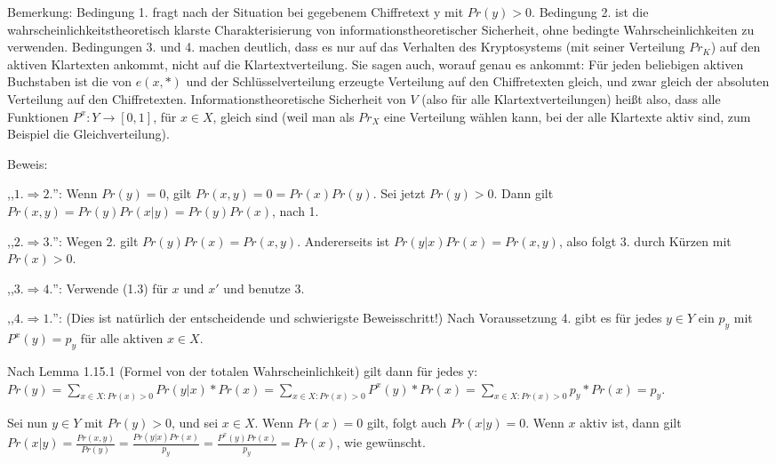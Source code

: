 \documentclass[a4paper]{article}
\begin{document}
\begin{multicols}{3}
    Bemerkung: Bedingung 1. fragt nach der Situation bei gegebenem Chiffretext y mit $Pr(y)>0$. Bedingung 2. ist die wahrscheinlichkeitstheoretisch klarste Charakterisierung von informationstheoretischer Sicherheit, ohne bedingte Wahrscheinlichkeiten zu verwenden. Bedingungen 3. und 4. machen deutlich, dass es nur auf das Verhalten des Kryptosystems (mit seiner Verteilung $Pr_K$) auf den aktiven Klartexten ankommt, nicht auf die Klartextverteilung. Sie sagen auch, worauf genau es ankommt: Für jeden beliebigen aktiven Buchstaben ist die von $e(x,*)$ und der Schlüsselverteilung erzeugte Verteilung auf den Chiffretexten gleich, und zwar gleich der absoluten Verteilung auf den Chiffretexten. Informationstheoretische Sicherheit von $V$ (also für alle Klartextverteilungen) heißt also, dass alle Funktionen $P^x:Y\rightarrow [0,1]$, für $x\in X$, gleich sind (weil man als $Pr_X$ eine Verteilung wählen kann, bei der alle Klartexte aktiv sind, zum Beispiel die Gleichverteilung).

    Beweis:
    \begin{itemize*}
        \item ,,$1.\Rightarrow 2.$'': Wenn $Pr(y)=0$, gilt $Pr(x,y)=0=Pr(x)Pr(y)$. Sei jetzt $Pr(y)>0$. Dann gilt $Pr(x,y)=Pr(y)Pr(x|y) = Pr(y)Pr(x)$, nach 1.
        \item ,,$2.\Rightarrow 3.$'': Wegen 2. gilt $Pr(y)Pr(x)=Pr(x,y)$. Andererseits ist $Pr(y|x)Pr(x)=Pr(x,y)$, also folgt 3. durch Kürzen mit $Pr(x)>0$.
        \item ,,$3.\Rightarrow 4.$'': Verwende (1.3) für $x$ und $x'$ und benutze 3.
        \item ,,$4.\Rightarrow 1.$'': (Dies ist natürlich der entscheidende und schwierigste Beweisschritt!) Nach Voraussetzung 4. gibt es für jedes $y\in Y$ ein $p_y$ mit $P^x(y)=p_y$ für alle aktiven $x\in X$.
        \item Nach Lemma 1.15.1 (Formel von der totalen Wahrscheinlichkeit) gilt dann für jedes y: $Pr(y)=\sum_{x\in X:Pr(x)>0} Pr(y|x)*Pr(x) = \sum_{x\in X: Pr(x)>0} P^x(y)*Pr(x) = \sum_{x\in X:Pr(x)>0} p_y*Pr(x) =p_y$.
        \item Sei nun $y\in Y$ mit $Pr(y)>0$, und sei $x\in X$. Wenn $Pr(x)=0$ gilt, folgt auch $Pr(x|y)=0$. Wenn $x$ aktiv ist, dann gilt $Pr(x|y)=\frac{Pr(x,y)}{Pr(y)}=\frac{Pr(y|x)Pr(x)}{p_y}=\frac{P^x(y)Pr(x)}{p_y}=Pr(x)$, wie gewünscht.
    \end{itemize*}


\end{multicols}
\end{document}
